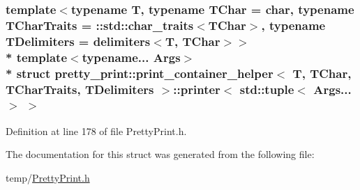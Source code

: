 \subsubsection*{template$<$typename T, typename T\+Char = char, typename T\+Char\+Traits = \+::std\+::char\+\_\+traits$<$\+T\+Char$>$, typename T\+Delimiters = delimiters$<$\+T, T\+Char$>$$>$\\*
template$<$typename... Args$>$\\*
struct pretty\+\_\+print\+::print\+\_\+container\+\_\+helper$<$ T, T\+Char, T\+Char\+Traits, T\+Delimiters $>$\+::printer$<$ std\+::tuple$<$ Args... $>$ $>$}



Definition at line 178 of file Pretty\+Print.\+h.



The documentation for this struct was generated from the following file\+:\begin{DoxyCompactItemize}
\item 
temp/\hyperlink{PrettyPrint_8h}{Pretty\+Print.\+h}\end{DoxyCompactItemize}

